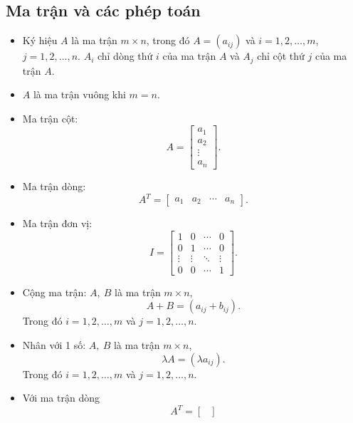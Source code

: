 \documentclass[12pt,a4paper]{report}
\begin{document}
\subsection{ Ma trận và các phép toán}
\begin{itemize}
\item Ký hiệu $A$ là ma trận $m\times n$, trong đó $A=(a_{ij})$ và $i=1,2,\ldots,m$, $j=1,2,\ldots,n$. $A_i$ chỉ dòng thứ $i$ của ma trận $A$ và $A_j$ chỉ cột thứ $j$ của ma trận $A$.
\item $A$ là ma trận vuông khi $m=n$.
\item Ma trận cột:
\begin{equation*}
A = \begin{bmatrix}
        a_1 \\
        a_2 \\
        \vdots \\
        a_n
	\end{bmatrix}.
\end{equation*}
\item Ma trận dòng:
\begin{equation*}
A^T = \begin{bmatrix}
	a_1 & a_2 & \cdots & a_n
	\end{bmatrix}.
\end{equation*}
\item Ma trận đơn vị:
\begin{equation*}
I = \begin{bmatrix}
        1 & 0 & \cdots & 0 \\
		0 & 1 & \cdots & 0 \\
		\vdots & \vdots & \ddots & \vdots \\
		0 & 0 & \cdots & 1
	\end{bmatrix}.
\end{equation*}
\item Cộng ma trận: $A, \: B$ là ma trận $m\times n$,
\begin{equation*}
A + B = (a_{ij}+b_{ij}).
\end{equation*}
Trong đó $i=1,2,\ldots,m$ và $j=1,2,\ldots,n$.
\item Nhân với 1 số: $A, \: B$ là ma trận $m\times n$,
\begin{equation*}
\lambda A = (\lambda a_{ij}).
\end{equation*}
Trong đó $i=1,2,\ldots,m$ và $j=1,2,\ldots,n$.
\item Với ma trận dòng
\begin{equation*}
A^T = \begin{bmatrix}

\end{bmatrix}
\end{equation*}
\end{itemize}
\end{document}

